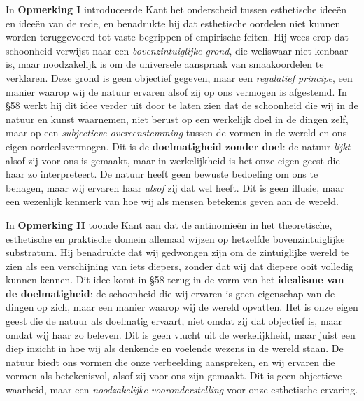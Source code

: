 \begin{mdframed}[leftmargin=0pt,rightmargin=0pt,backgroundcolor=blue!6,linecolor=white,innertopmargin=6pt,innerbottommargin=6pt]
In \textbf{Opmerking I} introduceerde Kant het onderscheid tussen esthetische ideeën en ideeën van de rede, en benadrukte hij dat esthetische oordelen niet kunnen worden teruggevoerd tot vaste begrippen of empirische feiten. Hij wees erop dat schoonheid verwijst naar een \textit{bovenzintuiglijke grond}, die weliswaar niet kenbaar is, maar noodzakelijk is om de universele aanspraak van smaakoordelen te verklaren. Deze grond is geen objectief gegeven, maar een \textit{regulatief principe}, een manier waarop wij de natuur ervaren alsof zij op ons vermogen is afgestemd. In §58 werkt hij dit idee verder uit door te laten zien dat de schoonheid die wij in de natuur en kunst waarnemen, niet berust op een werkelijk doel in de dingen zelf, maar op een \textit{subjectieve overeenstemming} tussen de vormen in de wereld en ons eigen oordeelsvermogen. Dit is de \textbf{doelmatigheid zonder doel}: de natuur \textit{lijkt} alsof zij voor ons is gemaakt, maar in werkelijkheid is het onze eigen geest die haar zo interpreteert. De natuur heeft geen bewuste bedoeling om ons te behagen, maar wij ervaren haar \textit{alsof} zij dat wel heeft. Dit is geen illusie, maar een wezenlijk kenmerk van hoe wij als mensen betekenis geven aan de wereld.

In \textbf{Opmerking II} toonde Kant aan dat de antinomieën in het theoretische, esthetische en praktische domein allemaal wijzen op hetzelfde bovenzintuiglijke substratum. Hij benadrukte dat wij gedwongen zijn om de zintuiglijke wereld te zien als een verschijning van iets diepers, zonder dat wij dat diepere ooit volledig kunnen kennen. Dit idee komt in §58 terug in de vorm van het \textbf{idealisme van de doelmatigheid}: de schoonheid die wij ervaren is geen eigenschap van de dingen op zich, maar een manier waarop wij de wereld opvatten. Het is onze eigen geest die de natuur als doelmatig ervaart, niet omdat zij dat objectief is, maar omdat wij haar zo beleven. Dit is geen vlucht uit de werkelijkheid, maar juist een diep inzicht in hoe wij als denkende en voelende wezens in de wereld staan. De natuur biedt ons vormen die onze verbeelding aanspreken, en wij ervaren die vormen als betekenisvol, alsof zij voor ons zijn gemaakt. Dit is geen objectieve waarheid, maar een \textit{noodzakelijke vooronderstelling} voor onze esthetische ervaring.


\end{mdframed}
